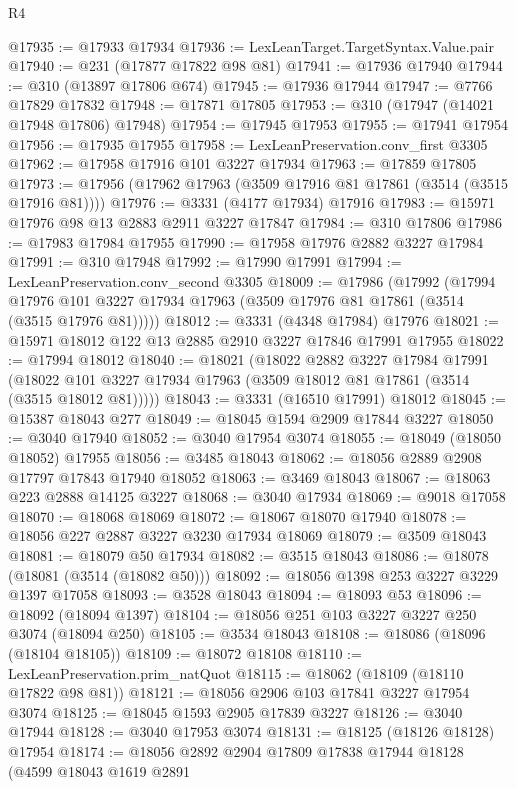 \begin{lexlean}{R4}
\begin{coremodule}
@17935 := @17933 @17934
@17936 := LexLeanTarget.TargetSyntax.Value.pair
@17940 := @231 (@17877 @17822 @98 @81)
@17941 := @17936 @17940
@17944 := @310 (@13897 @17806 @674)
@17945 := @17936 @17944
@17947 := @7766 @17829 @17832
@17948 := @17871 @17805
@17953 := @310 (@17947 (@14021 @17948 @17806) @17948)
@17954 := @17945 @17953
@17955 := @17941 @17954
@17956 := @17935 @17955
@17958 := LexLeanPreservation.conv_first @3305
@17962 := @17958 @17916 @101 @3227 @17934
@17963 := @17859 @17805
@17973 := @17956 (@17962 @17963 (@3509 @17916 @81 @17861 (@3514 (@3515 @17916 @81))))
@17976 := @3331 (@4177 @17934) @17916
@17983 := @15971 @17976 @98 @13 @2883 @2911 @3227 @17847
@17984 := @310 @17806
@17986 := @17983 @17984 @17955
@17990 := @17958 @17976 @2882 @3227 @17984
@17991 := @310 @17948
@17992 := @17990 @17991
@17994 := LexLeanPreservation.conv_second @3305
@18009 := @17986
    (@17992
      (@17994 @17976 @101 @3227 @17934 @17963 (@3509 @17976 @81 @17861 (@3514 (@3515 @17976 @81)))))
@18012 := @3331 (@4348 @17984) @17976
@18021 := @15971 @18012 @122 @13 @2885 @2910 @3227 @17846 @17991 @17955
@18022 := @17994 @18012
@18040 := @18021
    (@18022
      @2882
      @3227
      @17984
      @17991
      (@18022 @101 @3227 @17934 @17963 (@3509 @18012 @81 @17861 (@3514 (@3515 @18012 @81)))))
@18043 := @3331 (@16510 @17991) @18012
@18045 := @15387 @18043 @277
@18049 := @18045 @1594 @2909 @17844 @3227
@18050 := @3040 @17940
@18052 := @3040 @17954 @3074
@18055 := @18049 (@18050 @18052) @17955
@18056 := @3485 @18043
@18062 := @18056 @2889 @2908 @17797 @17843 @17940 @18052
@18063 := @3469 @18043
@18067 := @18063 @223 @2888 @14125 @3227
@18068 := @3040 @17934
@18069 := @9018 @17058
@18070 := @18068 @18069
@18072 := @18067 @18070 @17940
@18078 := @18056 @227 @2887 @3227 @3230 @17934 @18069
@18079 := @3509 @18043
@18081 := @18079 @50 @17934
@18082 := @3515 @18043
@18086 := @18078 (@18081 (@3514 (@18082 @50)))
@18092 := @18056 @1398 @253 @3227 @3229 @1397 @17058
@18093 := @3528 @18043
@18094 := @18093 @53
@18096 := @18092 (@18094 @1397)
@18104 := @18056 @251 @103 @3227 @3227 @250 @3074 (@18094 @250)
@18105 := @3534 @18043
@18108 := @18086 (@18096 (@18104 @18105))
@18109 := @18072 @18108
@18110 := LexLeanPreservation.prim_natQuot
@18115 := @18062 (@18109 (@18110 @17822 @98 @81))
@18121 := @18056 @2906 @103 @17841 @3227 @17954 @3074
@18125 := @18045 @1593 @2905 @17839 @3227
@18126 := @3040 @17944
@18128 := @3040 @17953 @3074
@18131 := @18125 (@18126 @18128) @17954
@18174 := @18056
    @2892
    @2904
    @17809
    @17838
    @17944
    @18128
    (@4599
      @18043
      @1619
      @2891

\end{coremodule}
\end{lexlean}

